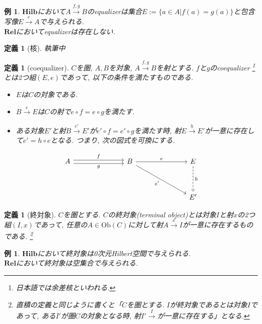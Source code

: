 \documentclass[a4paper,12pt]{ltjsarticle}
\theoremstyle{break}
\newtheorem{defn}[thm]{定義}
\newtheorem{eg}[thm]{例}
\newcommand{\rel}{\mathbf{Rel}}
\newcommand{\hilb}{\mathbf{Hilb}}
\newcommand{\Ob}{\mathrm{Ob}}
\newcommand{\xr}[1]{\xrightarrow{#1}}
\newcommand{\ci}{\circ}
\numberwithin{equation}{section}
\begin{document}
\begin{eg}
  $\hilb$において$A \xr{f,g} B$のequalizerは集合$E:=\{ a \in A | f(a)=g(a) \}$と包含写像$E \xr{e} A$で与えられる. \\
  $\rel$においてequalizerは存在しない. 
\end{eg}  

\begin{defn}[核]
  執筆中
\end{defn}

\begin{defn}[coequalizer]
  $C$を圏, $A, B$を対象, $A \xr{f,g} B$を射とする. 
  $f$と$g$のcoequalizer
  \footnote{
      日本語では余差核といわれる.
    }
  とは2つ組$(E, e)$であって, 以下の条件を満たすものである. 
  \begin{itemize}
    \item $E$は$C$の対象である. 
    \item $B \xr{e} E$は$C$の射で$e \ci f = e \ci g$を満たす. 
    \item ある対象$E'$と射$B \xr{e'} E'$が$e' \ci f = e' \ci g$を満たす時, 射$E \xr{h} E'$が一意に存在して$e' = h \ci e$となる. 
    つまり, 次の図式を可換にする. 
  \end{itemize}
  \[\begin{tikzcd}
    A &&& B &&& E \\
    \\
    &&&&&& {E'}
    \arrow["g"', shift right=1, from=1-1, to=1-4]
    \arrow["e", from=1-4, to=1-7]
    \arrow["h", dashed, from=1-7, to=3-7]
    \arrow["{e'}"', from=1-4, to=3-7]
    \arrow["f", shift left=1, from=1-1, to=1-4]
  \end{tikzcd}\]  
\end{defn}

\begin{defn}[終対象]
  $C$を圏とする. 
  $C$の終対象(terminal object)とは対象$I$と射$x$の2つ組$(I,x)$であって, 任意の$A \in \Ob(C)$に対して射$A \xr{x} I$が一意に存在するものである.
  \footnote{
    直積の定義と同じように書くと「$C$を圏とする. 
    $I$が終対象であるとは対象$I$であって, ある$I'$が圏$C$の対象となる時, 射$I' \xr I$が一意に存在する」となる. 
  } 
\end{defn}

\begin{eg}
  $\hilb$において終対象は0次元Hilbert空間で与えられる. \\
  $\rel$において終対象は空集合で与えられる. 
\end{eg}
\end{document}
